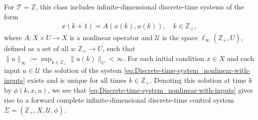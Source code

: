 \documentclass[twocolumn]{IEEEtran} %
\theoremstyle{definition}
\newcommand{\Uc}{\mathcal{U}}%
\newcommand{\Z}{\mathbb{Z}}%
\newcommand{\T}{\ensuremath{\mathcal{T}}}  %
\begin{document}
For $\T=\Z$, this class includes infinite-dimensional discrete-time systems of the form
\begin{eqnarray}
x(k+1) = A (x(k),u(k)), \quad k\in\Z_+,
\label{eq:Discrete-time-system_nonlinear-with-inputs}
\end{eqnarray}
where $A: X \times U \to X$ is a nonlinear operator and $\Uc$ is the space $\ell_\infty(\Z_+,U)$, defined as a set 
of all $u:\Z_+ \to U$, such that $\|u\|_{\infty} := \sup_{k\in\Z_+}\|u(k)\|_U < \infty$. 
For each initial condition $x \in X$ and each input $u\in\Uc$ the solution of the system \eqref{eq:Discrete-time-system_nonlinear-with-inputs} exists and is unique for all times $k\in\Z_+$. Denoting this solution at time $k$ by $\phi(k,x,u)$, we see that 
\eqref{eq:Discrete-time-system_nonlinear-with-inputs}
gives rise to a forward complete infinite-dimensional discrete-time control system $\Sigma=(\Z_+, X,\Uc,\phi)$.
\end{document}
